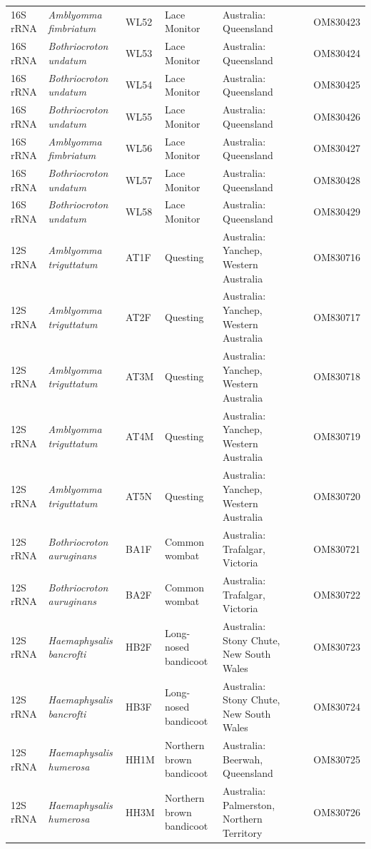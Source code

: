 \documentclass[a4paper, nobind]{templates/ociamthesis}
\begin{document}
\begin{landscape}
\begin{longtable}[t]{l>{}lllllll}
16S rRNA & \em{Amblyomma fimbriatum} & WL52 & Lace Monitor & Australia: Queensland &  &  & OM830423\\
16S rRNA & \em{Bothriocroton undatum} & WL53 & Lace Monitor & Australia: Queensland &  &  & OM830424\\
16S rRNA & \em{Bothriocroton undatum} & WL54 & Lace Monitor & Australia: Queensland &  &  & OM830425\\
16S rRNA & \em{Bothriocroton undatum} & WL55 & Lace Monitor & Australia: Queensland &  &  & OM830426\\
16S rRNA & \em{Amblyomma fimbriatum} & WL56 & Lace Monitor & Australia: Queensland &  &  & OM830427\\
16S rRNA & \em{Bothriocroton undatum} & WL57 & Lace Monitor & Australia: Queensland &  &  & OM830428\\
16S rRNA & \em{Bothriocroton undatum} & WL58 & Lace Monitor & Australia: Queensland &  &  & OM830429\\
12S rRNA & \em{Amblyomma triguttatum} & AT1F & Questing & Australia: Yanchep, Western Australia &  &  & OM830716\\
12S rRNA & \em{Amblyomma triguttatum} & AT2F & Questing & Australia: Yanchep, Western Australia &  &  & OM830717\\
12S rRNA & \em{Amblyomma triguttatum} & AT3M & Questing & Australia: Yanchep, Western Australia &  &  & OM830718\\
12S rRNA & \em{Amblyomma triguttatum} & AT4M & Questing & Australia: Yanchep, Western Australia &  &  & OM830719\\
12S rRNA & \em{Amblyomma triguttatum} & AT5N & Questing & Australia: Yanchep, Western Australia &  &  & OM830720\\
12S rRNA & \em{Bothriocroton auruginans} & BA1F & Common wombat & Australia: Trafalgar, Victoria &  &  & OM830721\\
12S rRNA & \em{Bothriocroton auruginans} & BA2F & Common wombat & Australia: Trafalgar, Victoria &  &  & OM830722\\
12S rRNA & \em{Haemaphysalis bancrofti} & HB2F & Long-nosed bandicoot & Australia: Stony Chute, New South Wales &  &  & OM830723\\
12S rRNA & \em{Haemaphysalis bancrofti} & HB3F & Long-nosed bandicoot & Australia: Stony Chute, New South Wales &  &  & OM830724\\
12S rRNA & \em{Haemaphysalis humerosa} & HH1M & Northern brown bandicoot & Australia: Beerwah, Queensland &  &  & OM830725\\
12S rRNA & \em{Haemaphysalis humerosa} & HH3M & Northern brown bandicoot & Australia: Palmerston, Northern Territory &  &  & OM830726\\

\end{longtable}
\end{landscape}
\end{document}
